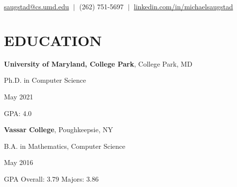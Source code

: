 \documentclass{res}
\newcommand{\vb}{\; | \;}
\begin{document}
 
                                  
\begin{resume}
\vspace{-5pt}
{\large %
  \begin{center}
    \href{mailto:saugstad@cs.umd.edu}{saugstad@cs.umd.edu} $\vb$
    (262) 751-5697 $\vb$
    \href{https://www.linkedin.com/in/michaelsaugstad/}
         {linkedin.com/in/michaelsaugstad}
  \end{center}

  \vspace{-2pt}
  \section{\hspace{0.2in}EDUCATION}
    \vspace{3pt} %
    {\bf University of Maryland, College Park}, College Park, MD\\
    \begin{minipage}{5.6in}
      Ph.D. in Computer Science
    \end{minipage}
    \begin{minipage}{2in}
      May 2021
    \end{minipage}
    GPA: 4.0

    \vspace{-5pt} %
    {\bf Vassar College}, Poughkeepsie, NY\\
    \begin{minipage}{5.6in}
      B.A. in Mathematics, Computer Science
    \end{minipage}
    \begin{minipage}{2in}
      May 2016
    \end{minipage}
    GPA Overall: 3.79  Majors: 3.86

  \vspace{-1pt}
}
\end{resume}
\end{document}
